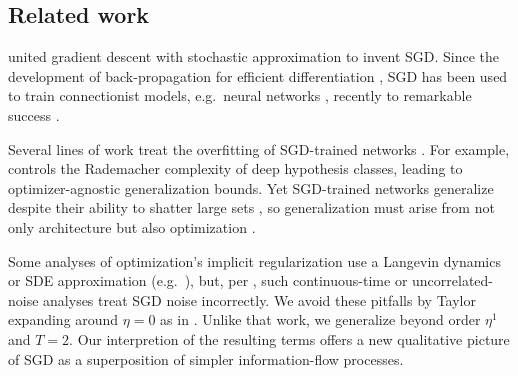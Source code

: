 \documentclass[anon,12pt]{colt2021} %
\begin{document}
{        \subsection{Related work}\label{sect:related}
    

            \cite{ki52} united gradient descent \citep{ca47} with stochastic
            approximation \citep{ro51} to invent SGD.  Since the development of
            back-propagation for efficient differentiation \citep{we74}, SGD
            has been used to train connectionist models, e.g.\ neural networks
            \citep{bo91}, recently to remarkable success \citep{le15}.
        
        
            Several lines of work treat the overfitting of SGD-trained networks
            \citep{ne17a}.  For example, \cite{ba17} controls the Rademacher
            complexity of deep hypothesis classes, leading to
            optimizer-agnostic generalization bounds.  Yet SGD-trained networks
            generalize despite their ability to shatter large sets
            \citep{zh17}, so generalization must arise from not only
            architecture but also optimization \citep{ne17b}.  

            Some analyses of optimization's implicit regularization use a
            Langevin dynamics or SDE approximation (e.g.\ \cite{ch18,zh19}),
            but, per \cite{ya19a}, such continuous-time or uncorrelated-noise
            analyses treat SGD noise incorrectly.
            We avoid these pitfalls by Taylor expanding around $\eta=0$ as in
            \cite{ro18}.  Unlike that work, we generalize beyond order $\eta^1$
            and $T=2$.  %
            Our interpretion of the resulting
            terms offers a new qualitative picture of SGD as a superposition of
            simpler information-flow processes.
            

}
\end{document}
